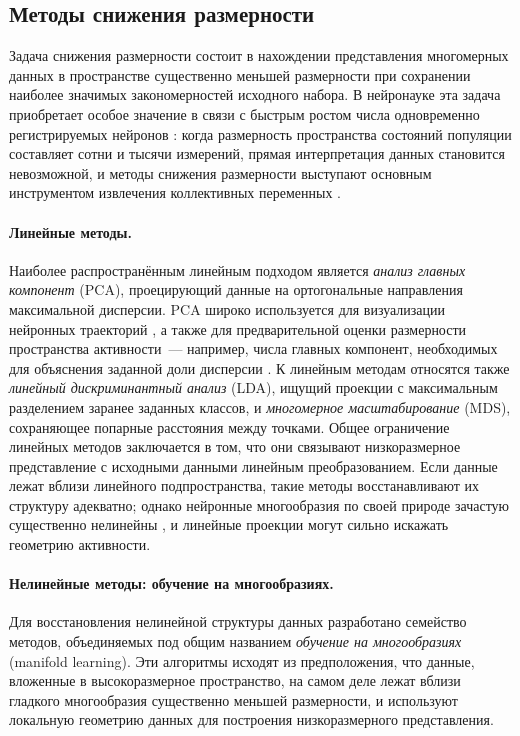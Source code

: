\subsection{Методы снижения размерности} \label{sec:dimred_methods}

Задача снижения размерности состоит в нахождении представления многомерных данных в пространстве существенно меньшей размерности при сохранении наиболее значимых закономерностей исходного набора.
В нейронауке эта задача приобретает особое значение в связи с быстрым ростом числа одновременно регистрируемых нейронов \cite{Stevenson2011}: когда размерность пространства состояний популяции составляет сотни и тысячи измерений, прямая интерпретация данных становится невозможной, и методы снижения размерности выступают основным инструментом извлечения коллективных переменных \cite{Cunningham2014}.

\paragraph{Линейные методы.}
Наиболее распространённым линейным подходом является \textit{анализ главных компонент} (PCA), проецирующий данные на ортогональные направления максимальной дисперсии.
PCA широко используется для визуализации нейронных траекторий \cite{Gallego2017}, а также для предварительной оценки размерности пространства активности~--- например, числа главных компонент, необходимых для объяснения заданной доли дисперсии \cite{Cunningham2014}.
К линейным методам относятся также \textit{линейный дискриминантный анализ} (LDA), ищущий проекции с максимальным разделением заранее заданных классов, и \textit{многомерное масштабирование} (MDS), сохраняющее попарные расстояния между точками.
Общее ограничение линейных методов заключается в том, что они связывают низкоразмерное представление с исходными данными линейным преобразованием.
Если данные лежат вблизи линейного подпространства, такие методы восстанавливают их структуру адекватно; однако нейронные многообразия по своей природе зачастую существенно нелинейны \cite{De2023, Fortunato2023}, и линейные проекции могут сильно искажать геометрию активности.

\paragraph{Нелинейные методы: обучение на многообразиях.}
Для восстановления нелинейной структуры данных разработано семейство методов, объединяемых под общим названием \textit{обучение на многообразиях} (manifold learning).
Эти алгоритмы исходят из предположения, что данные, вложенные в высокоразмерное пространство, на самом деле лежат вблизи гладкого многообразия существенно меньшей размерности, и используют локальную геометрию данных для построения низкоразмерного представления.

